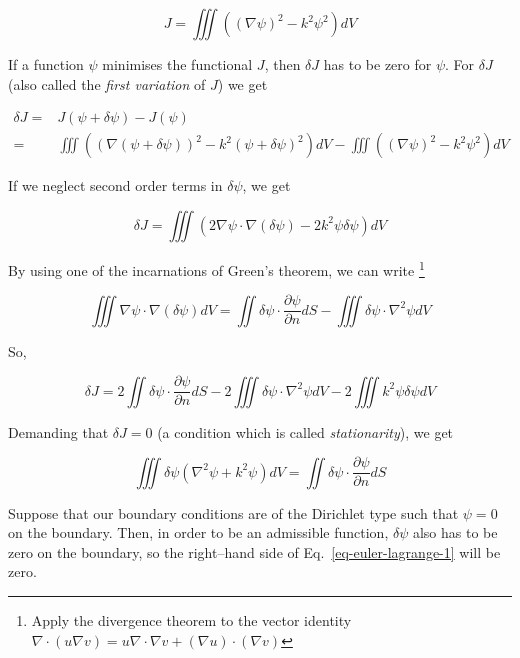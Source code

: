 \begin{equation}
J = \iiint \left((\nabla \psi)^2 - k^2 \psi^2 \right) dV \label{eq-variational1}
\end{equation} 

If a function $\psi$ minimises the functional $J$, then $\delta J$ has to be zero for $\psi$. For $\delta J$ (also called the \emph{first variation} of $J$) we get

\begin{align}
\delta J =& J(\psi + \delta \psi) - J(\psi) \\
         =& \iiint \left( (\nabla (\psi + \delta \psi))^2 - k^2 (\psi + \delta \psi)^2 \right) dV - \iiint \left((\nabla \psi)^2 - k^2 \psi^2 \right) dV
\end{align} 

If we neglect second order terms in $\delta \psi$, we get

\begin{equation}
\delta J = \iiint \left( 2 \nabla \psi \cdot \nabla (\delta \psi) - 2 k^2 \psi \delta \psi \right) dV
\end{equation}

By using one of the incarnations of Green's theorem, we can write \footnote{Apply the divergence theorem to the vector identity $\nabla \cdot (u \nabla v) = u \nabla \cdot \nabla v + (\nabla u) \cdot (\nabla v)$}

\begin{equation}
\iiint \nabla \psi \cdot \nabla (\delta \psi) dV = \iint \delta \psi \cdot \frac{\partial \psi}{\partial n} dS - \iiint \delta \psi \cdot \nabla^2 \psi dV
\end{equation} 

So,

\begin{equation}
\delta J = 2\iint \delta \psi \cdot \frac{\partial \psi}{\partial n} dS - 2\iiint \delta \psi \cdot \nabla^2 \psi dV - 2 \iiint k^2 \psi \delta \psi dV
\end{equation} 

Demanding that $\delta J = 0$ (a condition which is called \emph{stationarity}), we get

\begin{equation}
\iiint \delta \psi (\nabla^2 \psi + k^2 \psi ) dV = \iint \delta \psi \cdot \frac{\partial \psi}{\partial n} dS \label{eq-euler-lagrange-1}
\end{equation}

Suppose that our boundary conditions are of the Dirichlet type such that $\psi=0$ on the boundary. Then, in order to be an admissible function, $\delta \psi$ also has to be zero on the boundary, so the right--hand side of Eq.~\ref{eq-euler-lagrange-1} will be zero.

